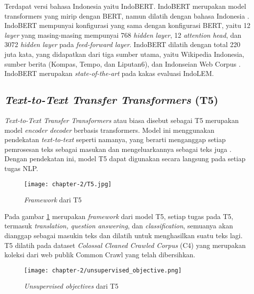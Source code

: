 Terdapat versi bahasa Indonesia yaitu IndoBERT. IndoBERT merupakan model transformers yang mirip dengan BERT, namun dilatih dengan bahasa Indonesia \parencite{indolem}. IndoBERT mempunyai konfigurasi yang sama dengan konfigurasi BERT, yaitu 12 \textit{layer} yang masing-masing mempunyai 768 \textit{hidden layer}, 12 \textit{attention head}, dan 3072 \textit{hidden layer} pada \textit{feed-forward layer}. IndoBERT dilatih dengan total 220 juta kata, yang didapatkan dari tiga sumber utama, yaitu Wikipedia Indonesia, sumber berita (Kompas, Tempo, dan Liputan6), dan Indonseian Web Corpus \parencite{indolem}. IndoBERT merupakan \textit{state-of-the-art} pada kakas evaluasi IndoLEM.

\subsection{\textit{Text-to-Text Transfer Transformers} (T5)}

\textit{Text-to-Text Transfer Transformers} atau biasa disebut sebagai T5 merupakan model \textit{encoder decoder} berbasis transformers. Model ini menggunakan pendekatan \textit{text-to-text} seperti namanya, yang berarti menganggap setiap pemrosesan teks sebagai masukan dan mengeluarkannya sebagai teks juga \parencite{T5}. Dengan pendekatan ini, model T5 dapat digunakan secara langsung pada setiap tugas NLP.

\begin{figure}[ht]
    \vspace{0.25cm}
    \centering
    \texttt{[image: chapter-2/T5.jpg]}
    \caption{\textit{Framework} dari T5 \parencite{T5}}
    \label{fig:T5}
\end{figure}

Pada gambar \ref{fig:T5} merupakan \textit{framework} dari model T5, setiap tugas pada T5, termasuk \textit{translation, question answering}, dan \textit{classification}, semuanya akan dianggap sebagai masukin teks dan dilatih untuk menghasilkan suatu teks lagi. T5 dilatih pada dataset \textit{Colossal Cleaned Crawled Corpus} (C4) yang merupakan koleksi dari web publik Common Crawl yang telah dibersihkan.

\begin{figure}[ht]
    \vspace{0.25cm}
    \centering
    \texttt{[image: chapter-2/unsupervised\_objective.png]}
    \caption{\textit{Unsupervised objectives} dari T5 \parencite{T5}}
    \label{fig:unsupervised-T5}
\end{figure}

